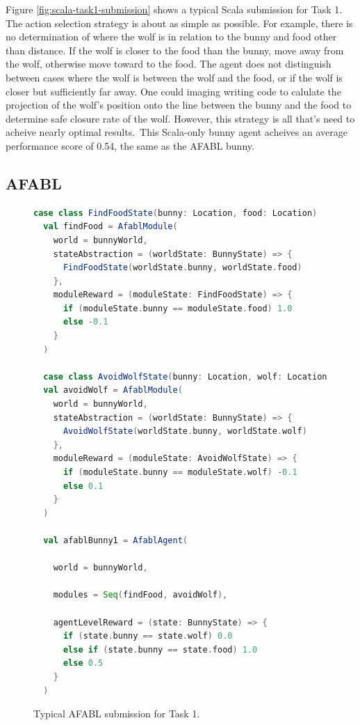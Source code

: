 Figure \ref{fig:scala-task1-submission} shows a typical Scala submission for Task 1. The action selection strategy is about as simple as possible. For example, there is no determination of where the wolf is in relation to the bunny and food other than distance. If the wolf is closer to the food than the bunny, move away from the wolf, otherwise move toward to the food. The agent does not distinguish between cases where the wolf is between the wolf and the food, or if the wolf is closer but sufficiently far away. One could imaging writing code to calulate the projection of the wolf's position onto the line between the bunny and the food to determine safe closure rate of the wolf. However, this strategy is all that's need to acheive nearly optimal results. This Scala-only bunny agent acheives an average performance score of 0.54, the same as the AFABL bunny.

\subsection{AFABL}

\begin{figure}[!h]
\begin{center}

\begin{lstlisting}[language=Scala]
  case class FindFoodState(bunny: Location, food: Location)
  val findFood = AfablModule(
    world = bunnyWorld,
    stateAbstraction = (worldState: BunnyState) => {
      FindFoodState(worldState.bunny, worldState.food)
    },
    moduleReward = (moduleState: FindFoodState) => {
      if (moduleState.bunny == moduleState.food) 1.0
      else -0.1
    }
  )

  case class AvoidWolfState(bunny: Location, wolf: Location)
  val avoidWolf = AfablModule(
    world = bunnyWorld,
    stateAbstraction = (worldState: BunnyState) => {
      AvoidWolfState(worldState.bunny, worldState.wolf)
    },
    moduleReward = (moduleState: AvoidWolfState) => {
      if (moduleState.bunny == moduleState.wolf) -0.1
      else 0.1
    }
  )

  val afablBunny1 = AfablAgent(

    world = bunnyWorld,

    modules = Seq(findFood, avoidWolf),

    agentLevelReward = (state: BunnyState) => {
      if (state.bunny == state.wolf) 0.0
      else if (state.bunny == state.food) 1.0
      else 0.5
    }
  )
\end{lstlisting}

\caption{Typical AFABL submission for Task 1.}
\end{center}
\label{fig:afabl-task1-submission}
\end{figure}

